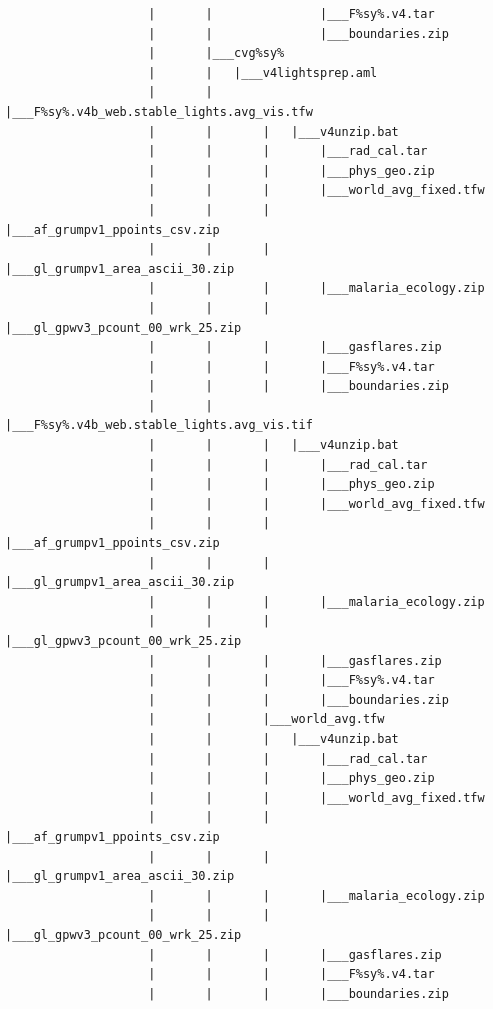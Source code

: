 \documentclass[]{book}
\begin{document}
\begin{verbatim}
                    |       |               |___F%sy%.v4.tar
                    |       |               |___boundaries.zip
                    |       |___cvg%sy%
                    |       |   |___v4lightsprep.aml
                    |       |       |___F%sy%.v4b_web.stable_lights.avg_vis.tfw
                    |       |       |   |___v4unzip.bat
                    |       |       |       |___rad_cal.tar
                    |       |       |       |___phys_geo.zip
                    |       |       |       |___world_avg_fixed.tfw
                    |       |       |       |___af_grumpv1_ppoints_csv.zip
                    |       |       |       |___gl_grumpv1_area_ascii_30.zip
                    |       |       |       |___malaria_ecology.zip
                    |       |       |       |___gl_gpwv3_pcount_00_wrk_25.zip
                    |       |       |       |___gasflares.zip
                    |       |       |       |___F%sy%.v4.tar
                    |       |       |       |___boundaries.zip
                    |       |       |___F%sy%.v4b_web.stable_lights.avg_vis.tif
                    |       |       |   |___v4unzip.bat
                    |       |       |       |___rad_cal.tar
                    |       |       |       |___phys_geo.zip
                    |       |       |       |___world_avg_fixed.tfw
                    |       |       |       |___af_grumpv1_ppoints_csv.zip
                    |       |       |       |___gl_grumpv1_area_ascii_30.zip
                    |       |       |       |___malaria_ecology.zip
                    |       |       |       |___gl_gpwv3_pcount_00_wrk_25.zip
                    |       |       |       |___gasflares.zip
                    |       |       |       |___F%sy%.v4.tar
                    |       |       |       |___boundaries.zip
                    |       |       |___world_avg.tfw
                    |       |       |   |___v4unzip.bat
                    |       |       |       |___rad_cal.tar
                    |       |       |       |___phys_geo.zip
                    |       |       |       |___world_avg_fixed.tfw
                    |       |       |       |___af_grumpv1_ppoints_csv.zip
                    |       |       |       |___gl_grumpv1_area_ascii_30.zip
                    |       |       |       |___malaria_ecology.zip
                    |       |       |       |___gl_gpwv3_pcount_00_wrk_25.zip
                    |       |       |       |___gasflares.zip
                    |       |       |       |___F%sy%.v4.tar
                    |       |       |       |___boundaries.zip

\end{verbatim}
\end{document}
